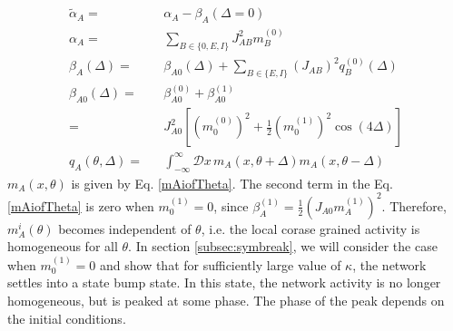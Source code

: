 \begin{eqnarray}
\tilde{\alpha}_A =&& \alpha_A - \beta_A(\Delta = 0) \\ %
\alpha_{A} =&& \sum_{B \in \lbrace 0, E, I \rbrace} J_{AB}^2 m_B^{(0)} \\
\beta_{A}(\Delta) =&&  \beta_{A0} (\Delta) + \sum_{B \in \lbrace E, I \rbrace}  \left(J_{AB}\right)^2 q_B^{(0)}(\Delta) \\
\beta_{A0} (\Delta) =&& \beta_{A0}^{(0)} + \beta_{A0}^{(1)} \nonumber \\
=&& J^2_{A0} \left[ (m_0^{(0)})^2 + \frac{1}{2}(m_0^{(1)})^2  \cos(4\Delta) \right] \\
q_A (\theta, \Delta) =&& \int_{-\infty}^{\infty} \mathcal{D} x \,  m_A(x, \theta + \Delta)  m_A(x, \theta - \Delta) 
\end{eqnarray}
$m_A(x, \theta)$ is given by Eq. \ref{mAiofTheta}\@. The second term in the Eq. \ref{mAiofTheta} is zero when $m_0^{(1)} = 0$, since $\beta_A^{(1)} = \frac{1}{2} (J_{A0} m_A^{(1)})^2$. Therefore, $m_A^i(\theta)$ becomes independent of $\theta$, i.e. the local corase grained activity is homogeneous for all $\theta$. In section \ref{subsec:symbreak}, we will consider the case when $m_0^{(1)} = 0$ and show that for sufficiently large value of $\kappa$, the network settles into a state bump state. In this state, the network activity is no longer homogeneous, but is peaked at some phase. The phase of the peak depends on the initial conditions.  
